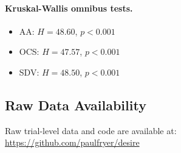 \documentclass{article}
\begin{document}
\paragraph{Kruskal-Wallis omnibus tests.}
\begin{itemize}
    \item AA: $H = 48.60$, $p < 0.001$
    \item OCS: $H = 47.57$, $p < 0.001$
    \item SDV: $H = 48.50$, $p < 0.001$
\end{itemize}

\subsection{Raw Data Availability}

Raw trial-level data and code are available at: \url{https://github.com/paulfryer/desire}
\end{document}
